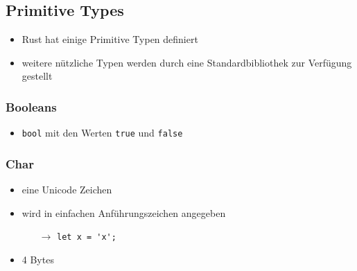 \documentclass[a4paper,12pt]{article}
\begin{document}
\subsection{Primitive Types}
	\begin{itemize}
	  \item Rust hat einige Primitive Typen definiert
	  \item weitere nützliche Typen werden durch eine Standardbibliothek zur Verfügung gestellt
	\end{itemize}
\subsubsection*{Booleans}
	\begin{itemize}
	  \item \verb|bool| mit den Werten \verb|true| und \verb|false|
	\end{itemize}
\subsubsection*{Char}
	\begin{itemize}
	  \item eine Unicode Zeichen
	  \item wird in einfachen Anführungszeichen angegeben
	  \begin{itemize}
	      \item[$\rightarrow$] \verb|let x = 'x';| 
	  \end{itemize}
	  \item 4 Bytes
	\end{itemize}
	
\end{document}
